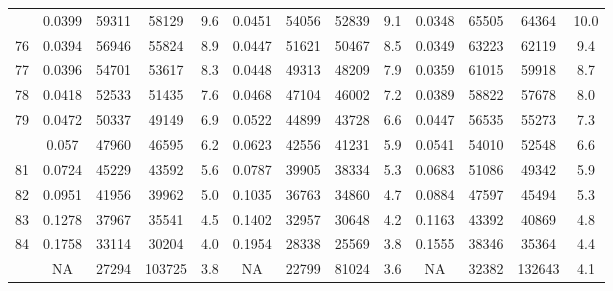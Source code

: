 \documentclass[
  14pt,
]{article}
\begin{document}
\begin{longtable}[t]{lcccccccccccc}
\addlinespace
75 & 0.0399 & 59311 & 58129 & 9.6 & 0.0451 & 54056 & 52839 & 9.1 & 0.0348 & 65505 & 64364 & 10.0\\
76 & 0.0394 & 56946 & 55824 & 8.9 & 0.0447 & 51621 & 50467 & 8.5 & 0.0349 & 63223 & 62119 & 9.4\\
77 & 0.0396 & 54701 & 53617 & 8.3 & 0.0448 & 49313 & 48209 & 7.9 & 0.0359 & 61015 & 59918 & 8.7\\
78 & 0.0418 & 52533 & 51435 & 7.6 & 0.0468 & 47104 & 46002 & 7.2 & 0.0389 & 58822 & 57678 & 8.0\\
79 & 0.0472 & 50337 & 49149 & 6.9 & 0.0522 & 44899 & 43728 & 6.6 & 0.0447 & 56535 & 55273 & 7.3\\
\addlinespace
80 & 0.057 & 47960 & 46595 & 6.2 & 0.0623 & 42556 & 41231 & 5.9 & 0.0541 & 54010 & 52548 & 6.6\\
81 & 0.0724 & 45229 & 43592 & 5.6 & 0.0787 & 39905 & 38334 & 5.3 & 0.0683 & 51086 & 49342 & 5.9\\
82 & 0.0951 & 41956 & 39962 & 5.0 & 0.1035 & 36763 & 34860 & 4.7 & 0.0884 & 47597 & 45494 & 5.3\\
83 & 0.1278 & 37967 & 35541 & 4.5 & 0.1402 & 32957 & 30648 & 4.2 & 0.1163 & 43392 & 40869 & 4.8\\
84 & 0.1758 & 33114 & 30204 & 4.0 & 0.1954 & 28338 & 25569 & 3.8 & 0.1555 & 38346 & 35364 & 4.4\\
\addlinespace
85 & NA & 27294 & 103725 & 3.8 & NA & 22799 & 81024 & 3.6 & NA & 32382 & 132643 & 4.1\\*
\end{longtable}
\end{document}
